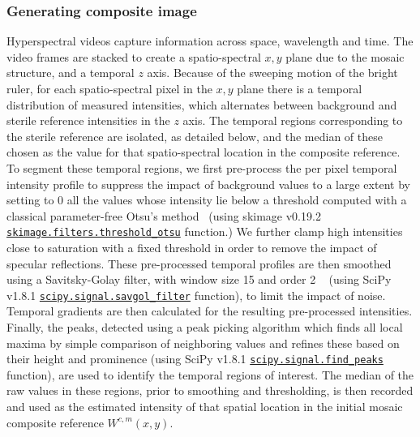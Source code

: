 \subsubsection{Generating composite image}
\label{algorithmcomposite}
Hyperspectral videos capture information across space, wavelength and time.
%
The video frames are stacked to create a spatio-spectral $x,y$ plane due to the mosaic structure, and a temporal $z$ axis.
%
%
%
%
Because of the sweeping motion of the bright ruler,
for each spatio-spectral pixel in the $x, y$ plane there is a temporal distribution of measured intensities, which alternates between background and sterile reference intensities in the $z$ axis.
The temporal regions corresponding to the sterile reference are isolated, as detailed below, and the median of these chosen as the value for that spatio-spectral location in the composite reference.
To segment these temporal regions,
%
%
%
we first pre-process the per pixel temporal intensity profile to suppress the impact of background values to a large extent by setting to 0 all the values whose intensity lie below a threshold computed with a classical parameter-free Otsu's method~\citep{Otsu1979} (using skimage v0.19.2 \href{https://scikit-image.org/docs/stable/api/skimage.filters.html\#skimage.filters.threshold_otsu}{\texttt{skimage.filters.threshold\_otsu}} function.)
We further clamp high intensities close to saturation with a fixed threshold in order to remove the impact of specular reflections.
%
These pre-processed temporal profiles are then smoothed using a Savitsky-Golay filter, with window size 15 and order 2
%
~\citep{Savitzky1964a}
(using SciPy v1.8.1 \href{https://docs.scipy.org/doc/scipy/reference/generated/scipy.signal.savgol_filter.html}{\texttt{scipy.signal.savgol\_filter}} function),
%
to limit the impact of noise.
Temporal gradients are then calculated for the resulting pre-processed intensities.
Finally, the peaks, detected using a peak picking algorithm which finds all local maxima by simple comparison of neighboring values and refines these based on their height and prominence (using SciPy v1.8.1 \href{https://docs.scipy.org/doc/scipy/reference/generated/scipy.signal.find_peaks.html}{\texttt{scipy.signal.find\_peaks}} function),
%
are used to identify the temporal regions of interest.
The median of the raw values in these regions, prior to smoothing and thresholding, is then recorded and used as the estimated intensity of that spatial location in the initial mosaic composite reference $W^{c,m}(x, y)$.
% 
% 
% 
% 	
% 	
% 	
% 	
% 
% 

